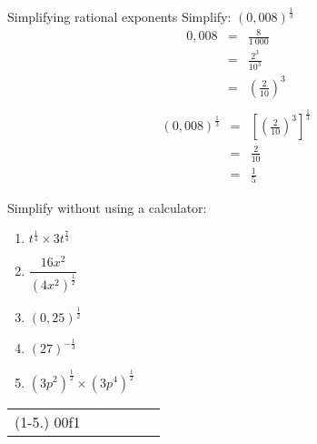 \begin{wex}
{Simplifying rational exponents} 
{Simplify: $(0,008)^{\frac{1}{3}}$}
{
\begin{eqnarray*}
 0,008 & = & \frac{8}{1~000} \\
       & = & \frac{2^3}{10^3} \\
       & = & \left(\frac{2}{10}\right)^3\\
\end{eqnarray*}
\begin{eqnarray*}
 (0,008)^{\frac{1}{3}} & = & \left[\left(\frac{2}{10}\right)^3\right]^{\frac{1}{3}} \\
		 & = & \frac{2}{10} \\
		 & = & \frac{1}{5}
\end{eqnarray*}
}
\end{wex}

\begin{exercises}{}{Simplify without using a calculator:
\begin{multicols}{2}
\begin{enumerate}[label=\textbf{\arabic*}., itemsep=5pt]
 \item $ t^{\frac{1}{4}} \times 3t^{\frac{7}{4}} $
 \item $ \dfrac{16x^2}{(4x^2)^{\frac{1}{2}}} $
 \item $ (0,25)^{\frac{1}{2}} $
 \item $ (27)^{-\frac{1}{3}} $
 \item $ (3p^2)^{\frac{1}{2}} \times (3p^4)^{\frac{1}{2}} $
\end{enumerate}
\end{multicols}
\practiceinfo
\par 
\begin{tabular}[h]{cccccc}
(1-5.) 00f1\end{tabular}
}
\end{exercises}




